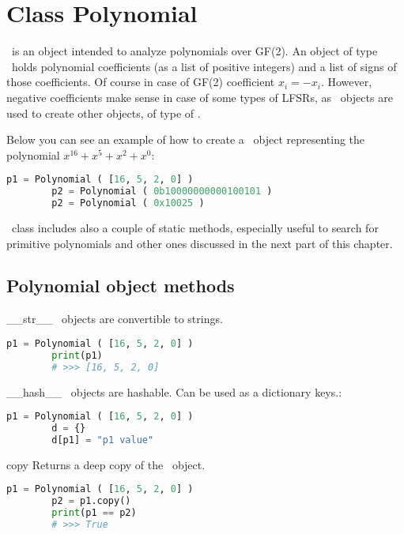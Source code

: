 \chapter{Class Polynomial}

\Polynomial\ is an object intended to analyze polynomials over GF(2). An object of type \Polynomial\ holds polynomial coefficients (as a list of positive integers) and a list of signs of those coefficients. Of course in case of GF(2) coefficient $x_i = -x_i$. However, negative coefficients make sense in case of some types of LFSRs, as \Polynomial\ objects are used to create other objects, of type of \Lfsr.

Below you can see an example of how to create a \Polynomial\ object representing the polynomial $x^{16} + x^5 + x^2 + x^0$:
\begin{lstlisting}[language=Python]
		p1 = Polynomial ( [16, 5, 2, 0] )
		p2 = Polynomial ( 0b10000000000100101 )
		p2 = Polynomial ( 0x10025 )
\end{lstlisting}

\Polynomial\ class includes also a couple of static methods, especially useful to search for primitive polynomials and other ones discussed in the next part of this chapter.

\section{Polynomial object methods}

 {\_\_str\_\_} {} {
	\Polynomial\ objects are convertible to strings.
}
\begin{lstlisting}[language=Python]
		p1 = Polynomial ( [16, 5, 2, 0] )
		print(p1)
		# >>> [16, 5, 2, 0]
\end{lstlisting}

 {\_\_hash\_\_} {} {
	\Polynomial\ objects are hashable. Can be used as a dictionary keys.:
}
\begin{lstlisting}[language=Python]
		p1 = Polynomial ( [16, 5, 2, 0] )
		d = {}
		d[p1] = "p1 value"
\end{lstlisting}

 {copy} {} {
	Returns a deep copy of the \Polynomial\ object.
}
\begin{lstlisting}[language=Python]
		p1 = Polynomial ( [16, 5, 2, 0] )
		p2 = p1.copy()
		print(p1 == p2)
		# >>> True
\end{lstlisting}

